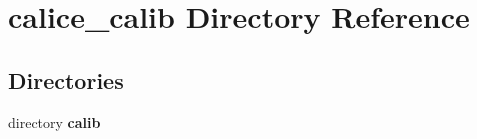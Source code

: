 \section{calice\-\_\-calib Directory Reference}
\label{dir_c2968450317907f1f2fd69207025813d}
\subsection*{Directories}
\begin{DoxyCompactItemize}
\item 
directory {\bf calib}
\end{DoxyCompactItemize}
